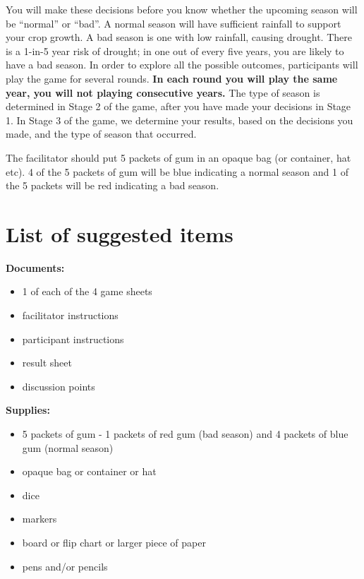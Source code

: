 \documentclass[letterpaper,10pt,english]{sphinxmanual}
\begin{document}
You will make these decisions before you know whether the upcoming season will be ``normal'' or ``bad''. A normal season will have sufficient rainfall to support your crop growth.  A bad season is one with low rainfall, causing drought. There is a 1-in-5 year risk of drought; in one out of every five years, you are likely to have a bad season. In order to explore all the possible outcomes, participants will play the game for several rounds. \textbf{In each round you will play the same year, you will not playing consecutive years.} The type of season is determined in Stage 2 of the game, after you have made your decisions in Stage 1.  In Stage 3 of the game, we determine your results, based on the decisions you made, and the type of season that occurred.

The facilitator should put 5 packets of gum in an opaque bag (or container, hat etc). 4 of the 5 packets of gum will be blue indicating a normal season and 1 of the 5 packets will be red indicating a bad season.


\section{List of suggested items}
\label{games/gameinstructions_quickreference_en:list-of-suggested-items}
\textbf{Documents:}
\begin{itemize}
\item {} 
1 of each of the 4 game sheets

\item {} 
facilitator instructions

\item {} 
participant instructions

\item {} 
result sheet

\item {} 
discussion points

\end{itemize}

\textbf{Supplies:}
\begin{itemize}
\item {} 
5 packets of gum - 1 packets of red gum (bad season) and 4 packets of blue gum (normal season)

\item {} 
opaque bag or container or hat

\item {} 
dice

\item {} 
markers

\item {} 
board or flip chart or larger piece of paper

\item {} 
pens and/or pencils

\end{itemize}
\end{document}
